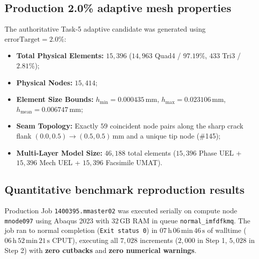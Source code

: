 \subsection{Production 2.0\% adaptive mesh properties}
The authoritative Task-5 adaptive candidate was generated using $\text{errorTarget} = 2.0\%$:
\begin{itemize}
  \item \textbf{Total Physical Elements:} $15{,}396$ ($14{,}963$ Quad4 / $97.19\%$, $433$ Tri3 / $2.81\%$);
  \item \textbf{Physical Nodes:} $15{,}414$;
  \item \textbf{Element Size Bounds:} $h_{\min} = 0.000435\,\mathrm{mm}$, $h_{\max} = 0.023106\,\mathrm{mm}$, $h_{\mathrm{mean}} = 0.006747\,\mathrm{mm}$;
  \item \textbf{Seam Topology:} Exactly $59$ coincident node pairs along the sharp crack flank $(0.0, 0.5) \to (0.5, 0.5)\,\mathrm{mm}$ and a unique tip node (\#145);
  \item \textbf{Multi-Layer Model Size:} $46{,}188$ total elements ($15{,}396$ Phase UEL + $15{,}396$ Mech UEL + $15{,}396$ Facsimile UMAT).
\end{itemize}

\subsection{Quantitative benchmark reproduction results}
Production Job \texttt{1400395.mmaster02} was executed serially on compute node \texttt{mnode097} using Abaqus 2023 with $32\,\mathrm{GB}$ RAM in queue \texttt{normal\_imfdfkmq}. The job ran to normal completion (\texttt{Exit status 0}) in $07\,\mathrm{h}\,06\,\mathrm{min}\,46\,\mathrm{s}$ of walltime ($06\,\mathrm{h}\,52\,\mathrm{min}\,21\,\mathrm{s}$ CPUT), executing all $7{,}028$ increments ($2{,}000$ in Step 1, $5{,}028$ in Step 2) with \textbf{zero cutbacks} and \textbf{zero numerical warnings}.

